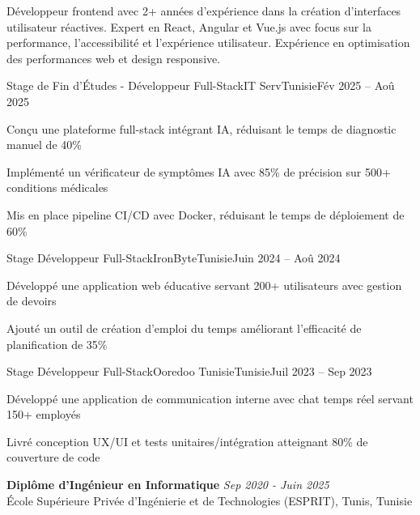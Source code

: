 \documentclass[11pt,a4paper]{article}
\begin{document}
\makecvheader
\makecontactinfo

Développeur frontend avec 2+ années d'expérience dans la création d'interfaces utilisateur réactives. Expert en React, Angular et Vue.js avec focus sur la performance, l'accessibilité et l'expérience utilisateur. Expérience en optimisation des performances web et design responsive.


\begin{internship}{Stage de Fin d'Études - Développeur Full-Stack}{IT Serv}{Tunisie}{Fév 2025 -- Aoû 2025}{}
  \item Conçu une plateforme full-stack intégrant IA, réduisant le temps de diagnostic manuel de 40\%
  \item Implémenté un vérificateur de symptômes IA avec 85\% de précision sur 500+ conditions médicales
  \item Mis en place pipeline CI/CD avec Docker, réduisant le temps de déploiement de 60\%
\end{internship}

\begin{internship}{Stage Développeur Full-Stack}{IronByte}{Tunisie}{Juin 2024 -- Aoû 2024}{}
  \item Développé une application web éducative servant 200+ utilisateurs avec gestion de devoirs
  \item Ajouté un outil de création d'emploi du temps améliorant l'efficacité de planification de 35\%
\end{internship}

\begin{internship}{Stage Développeur Full-Stack}{Ooredoo Tunisie}{Tunisie}{Juil 2023 -- Sep 2023}{}
  \item Développé une application de communication interne avec chat temps réel servant 150+ employés
  \item Livré conception UX/UI et tests unitaires/intégration atteignant 80\% de couverture de code
\end{internship}

\textbf{Diplôme d'Ingénieur en Informatique} \hfill \textit{Sep 2020 - Juin 2025}\\[-2pt]
École Supérieure Privée d'Ingénierie et de Technologies (ESPRIT), Tunis, Tunisie
\end{document}
